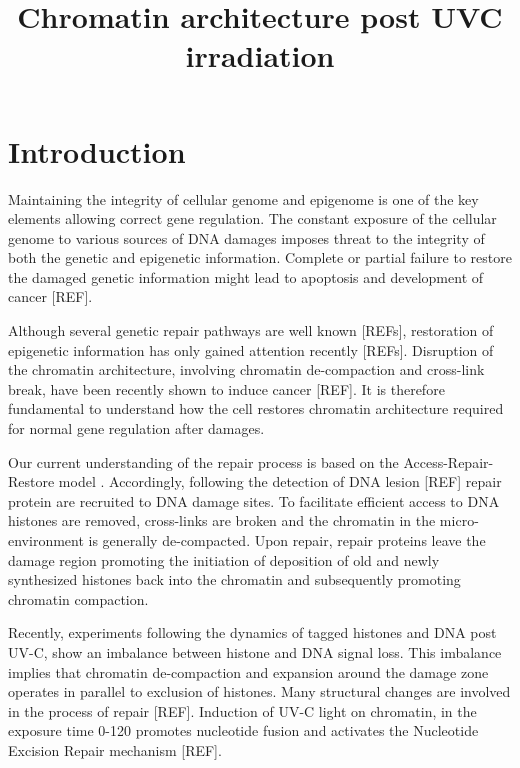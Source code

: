 \documentclass[12pt]{article}
\begin{document}
	
	\title{Chromatin architecture post UVC irradiation}
\maketitle
\section{Introduction}
    Maintaining the integrity of cellular genome and epigenome is one of the key elements allowing correct gene regulation. The constant exposure of the cellular genome to various sources of DNA damages imposes threat to the integrity of both the genetic and epigenetic information. Complete or partial failure to restore the damaged genetic information might lead to apoptosis and development of cancer [REF].
    
    Although several genetic repair pathways are well known [REFs], restoration of epigenetic information has only gained attention recently [REFs]. Disruption of the chromatin architecture, involving chromatin de-compaction and cross-link break, have been recently shown to induce cancer [REF]. It is therefore fundamental to understand how the cell restores chromatin architecture required for normal gene regulation after damages.
    
    
	Our current understanding of the repair process is based on the Access-Repair-Restore model \cite{green2002repair,smerdon1991dna}. Accordingly, following the detection of DNA lesion [REF] repair protein are recruited to DNA damage sites. To facilitate efficient access to DNA histones are removed, cross-links are broken and the chromatin in the micro-environment is generally de-compacted. Upon repair, repair proteins leave the damage region promoting the initiation of deposition of old and newly synthesized histones back into the chromatin and subsequently promoting chromatin compaction.
    
    Recently, experiments following the dynamics of tagged histones and DNA post UV-C, show an imbalance between histone and DNA signal loss. This imbalance implies that chromatin de-compaction and expansion around the damage zone operates in parallel to exclusion of histones. %
    Many structural changes are involved in the process of repair [REF].  Induction of UV-C light on chromatin, in the exposure time 0-120 promotes nucleotide fusion and activates the Nucleotide Excision Repair mechanism [REF].
    
\end{document}
